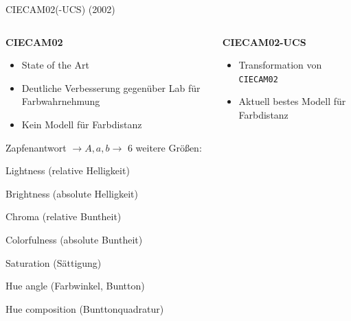 \documentclass[aspectratio=1610, 9pt]{beamer}
\begin{document}
\begin{frame}[c]{CIECAM02(-UCS) (2002)}
  \begin{columns}[t, onlytextwidth]%
    \begin{column}{0.45\textwidth}%
      \textbf{\Large CIECAM02}

      \begin{itemize}
        \item State of the Art
        \item Deutliche Verbesserung gegenüber Lab für Farbwahrnehmung
        \item Kein Modell für Farbdistanz
      \end{itemize}
      \vspace{1cm}
      Zapfenantwort ${}→ A, a,b → {}$ 6 weitere Größen:
      \begin{description}[$M$]
        \item[$J$] Lightness (relative Helligkeit)
        \item[$Q$] Brightness (absolute Helligkeit) \\[\baselineskip]
        \item[$C$] Chroma (relative Buntheit)
        \item[$M$] Colorfulness (absolute Buntheit)
        \item[$s$] Saturation (Sättigung) \\[\baselineskip]
        \item[$h$] Hue angle (Farbwinkel, Buntton)
        \item[$H$] Hue composition (Bunttonquadratur)
      \end{description}
    \end{column}
    \begin{column}{0.45\textwidth}%
      \textbf{\Large CIECAM02-UCS}
      \begin{itemize}
        \item Transformation von \texttt{CIECAM02}  
        \item Aktuell bestes Modell für Farbdistanz
      \end{itemize}
    \end{column}
  \end{columns}
\end{frame}
\end{document}

